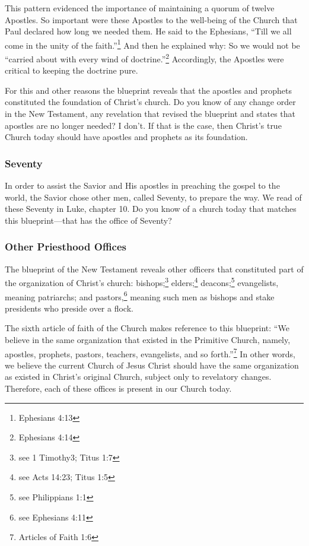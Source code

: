 \documentclass{article}
\begin{document}
This pattern evidenced the importance of maintaining a quorum of twelve Apostles. So important were these Apostles to the well-being of the Church that Paul declared how long we needed them. He said to the Ephesians, ``Till we all come in the unity of the faith.''\footnote{Ephesians 4:13} And then he explained why: So we would not be ``carried about with every wind of doctrine.''\footnote{Ephesians 4:14} Accordingly, the Apostles were critical to keeping the doctrine pure.

For this and other reasons the blueprint reveals that the apostles and prophets constituted the foundation of Christ's church. Do you know of any change order in the New Testament, any revelation that revised the blueprint and states that apostles are no longer needed? I don't. If that is the case, then Christ's true Church today should have apostles and prophets as its foundation.

\subsubsection*{Seventy}
In order to assist the Savior and His apostles in preaching the gospel to the world, the Savior chose other men, called Seventy, to prepare the way. We read of these Seventy in Luke, chapter 10. Do you know of a church today that matches this blueprint---that has the office of Seventy?

\subsubsection*{Other Priesthood Offices}
The blueprint of the New Testament reveals other officers that constituted part of the organization of Christ's church: bishops;\footnote{see 1 Timothy3; Titus 1:7} elders;\footnote{see Acts 14:23; Titus 1:5} deacons;\footnote{see Philippians 1:1} evangelists, meaning patriarchs; and pastors,\footnote{see Ephesians 4:11} meaning such men as bishops and stake presidents who preside over a flock.

The sixth article of faith of the Church makes reference to this blueprint: ``We believe in the same organization that existed in the Primitive Church, namely, apostles, prophets, pastors, teachers, evangelists, and so forth.''\footnote{Articles of Faith 1:6} In other words, we believe the current Church of Jesus Christ should have the same organization as existed in Christ's original Church, subject only to revelatory changes. Therefore, each of these offices is present in our Church today.
\end{document}
